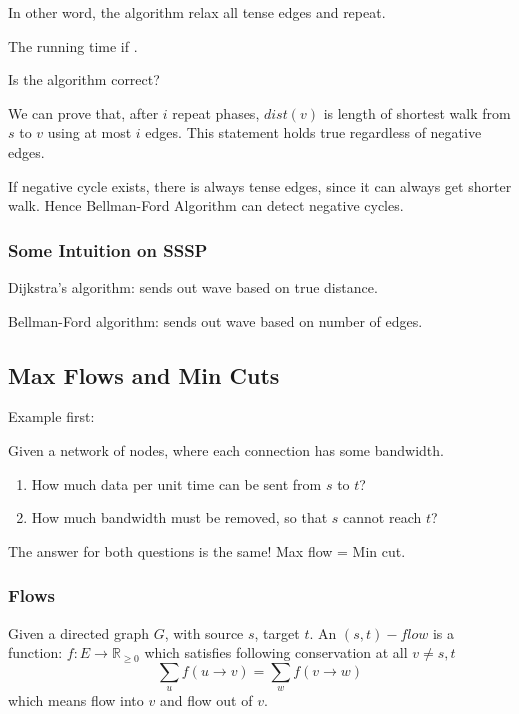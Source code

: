 In other word, the algorithm relax all tense edges and repeat.

The running time if .

Is the algorithm correct?

We can prove that, after $i$ repeat phases,
$dist(v)$ is length of shortest walk from $s$ to $v$ using at most $i$ edges.
This statement holds true regardless of negative edges.

If negative cycle exists, there is always tense edges,
since it can always get shorter walk.
Hence Bellman-Ford Algorithm can detect negative cycles.

\subsubsection{Some Intuition on SSSP}
Dijkstra's algorithm: sends out wave based on true distance.

\noindent Bellman-Ford algorithm: sends out wave based on number of edges.

\subsection{Max Flows and Min Cuts}
Example first:

Given a network of nodes, where each connection has some bandwidth.
\begin{enumerate}
    \item How much data per unit time can be sent from $s$ to $t$?
    \item How much bandwidth must be removed, so that $s$ cannot reach $t$?
\end{enumerate}
The answer for both questions is the same! Max flow = Min cut.

\subsubsection{Flows}
Given a directed graph $G$, with source $s$, target $t$. An $(s,t)-flow$ is a function:
$f:E \rightarrow \mathbb{R}_{\geq 0}$ which satisfies following conservation at all $v \neq s,t$
\[\sum_uf(u \rightarrow v) = \sum_wf(v \rightarrow w)\]
which means flow into $v$ and flow out of $v$.

